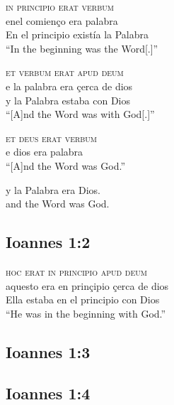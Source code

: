 \documentclass{report}[12pt]
\begin{document}
\begin{exe}
  \sn
  \glll 
  \textsc{in} \textsc{principio} \textsc{erat} \textsc{verbum} \\
  enel comien\c{c}o era palabra \\
  {En el} principio exist\'{i}a {la Palabra} \\
  \glt 
  ``In the beginning was the Word[.]''
\end{exe}

\begin{exe}
  \sn
  \glll
  \textsc{et} \textsc{verbum} \textsc{erat} \textsc{apud} \textsc{deum} \\
  e {la palabra} era {\c{c}erca de} dios \\
  y {la Palabra} estaba con Dios \\
  \glt
  ``[A]nd the Word was with God[.]''
\end{exe}

\begin{exe}
  \sn
  \gll
  \textsc{et} \textsc{deus} \textsc{erat} \textsc{verbum}\\
  e dios era palabra \\
  \glt
  ``[A]nd the Word was God.''
\end{exe}

\begin{exe}
  \sn
  \gll
  y la Palabra era Dios. \\
  and the Word was God. \\
\end{exe}

\subsection{Ioannes 1:2}

\begin{exe}
  \sn
  \glll
  \textsc{hoc} \textsc{erat} \textsc{in} \textsc{principio} \textsc{apud} \textsc{deum} \\
  aquesto era en prin\c{c}ipio {\c{c}erca de} dios \\
  Ella estaba {en el} principio con Dios \\
  \glt
  ``He was in the beginning with God.''
\end{exe}

\subsection{Ioannes 1:3}

\subsection{Ioannes 1:4}
\end{document}
